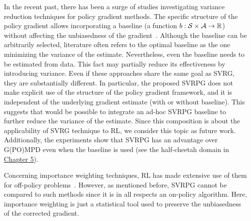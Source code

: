 In the recent past, there has been a surge of studies investigating variance reduction techniques for policy gradient methods.
The specific structure of the policy gradient allows incorporating a baseline (\ie a function $b :\mathcal{S}\times\mathcal{A} \to \mathbb R$) without affecting the unbiasedness of the gradient~\citep[\eg][]{williams1992simple,weaver2001optimal,peters2008reinforcement,Thomas2017actionbaseline,wu2018variance}.
Although the baseline can be arbitrarily selected, literature often refers to the optimal baseline as the one minimizing the variance of the estimate.
Nevertheless, even the baseline needs to be estimated from data. This fact may partially reduce its effectiveness by introducing variance.
Even if these approaches share the same goal as \acs{SVRG}, they are substantially different.
In particular, the proposed \acs{SVRPG} does not make explicit use of the structure of the policy gradient framework, and it is independent of the underlying gradient estimate (\ie with or without baseline).
This suggests that would be possible to integrate an ad-hoc \acs{SVRPG} baseline to further reduce the variance of the estimate.
Since this composition is about the applicability of \acs{SVRG} technique to \acs{RL}, we consider this topic as future work.
Additionally, the experiments show that \acs{SVRPG} has an advantage over G(PO)MPD even when the baseline is used (see the half-cheetah domain in \hyperref[chap:experiments]{Chapter 5}).

Concerning importance weighting techniques, \acs{RL} has made extensive use of them for off-policy problems~\citep[\eg][]{precup2000eligibility,thomas2015high}. However, as mentioned before, \acs{SVRPG} cannot be compared to such methods since it is in all respects an on-policy algorithm. Here, importance weighting is just a statistical tool used to preserve the unbiasedness of the corrected gradient.

\vspace{-0.05in}

